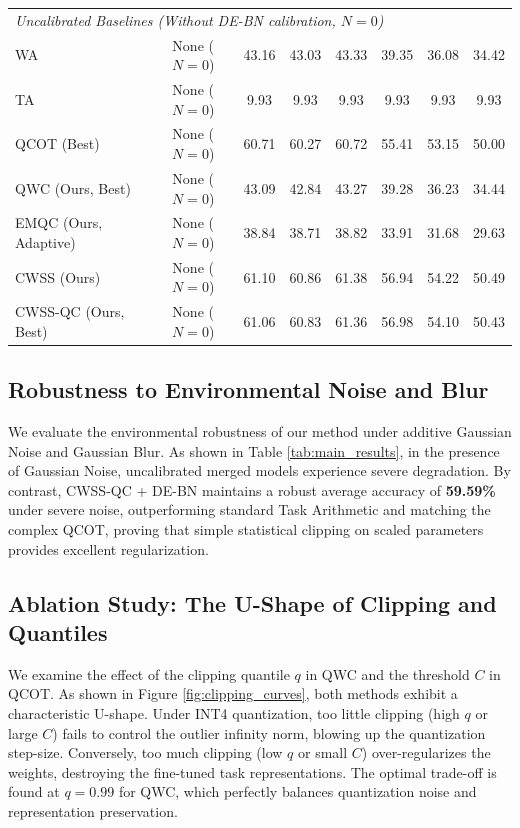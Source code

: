 \documentclass{article}
\theoremstyle{plain}
\theoremstyle{definition}
\theoremstyle{remark}
\begin{document}
\begin{table}[t]
\begin{tabular}{l c cccc cc}
\hline
\multicolumn{8}{l}{\textit{Uncalibrated Baselines (Without DE-BN calibration, $N=0$)}}\\
WA & None ($N=0$) & 43.16 & 43.03 & 43.33 & 39.35 & 36.08 & 34.42 \\
TA & None ($N=0$) & 9.93 & 9.93 & 9.93 & 9.93 & 9.93 & 9.93 \\
QCOT (Best) & None ($N=0$) & 60.71 & 60.27 & 60.72 & 55.41 & 53.15 & 50.00 \\
QWC (Ours, Best) & None ($N=0$) & 43.09 & 42.84 & 43.27 & 39.28 & 36.23 & 34.44 \\
EMQC (Ours, Adaptive) & None ($N=0$) & 38.84 & 38.71 & 38.82 & 33.91 & 31.68 & 29.63 \\
CWSS (Ours) & None ($N=0$) & 61.10 & 60.86 & 61.38 & 56.94 & 54.22 & 50.49 \\
CWSS-QC (Ours, Best) & None ($N=0$) & 61.06 & 60.83 & 61.36 & 56.98 & 54.10 & 50.43 \\
\hline
\end{tabular}
\end{table}


\subsection{Robustness to Environmental Noise and Blur}
We evaluate the environmental robustness of our method under additive Gaussian Noise and Gaussian Blur. As shown in Table \ref{tab:main_results}, in the presence of Gaussian Noise, uncalibrated merged models experience severe degradation. By contrast, CWSS-QC + DE-BN maintains a robust average accuracy of \textbf{59.59\%} under severe noise, outperforming standard Task Arithmetic and matching the complex QCOT, proving that simple statistical clipping on scaled parameters provides excellent regularization.

\subsection{Ablation Study: The U-Shape of Clipping and Quantiles}
We examine the effect of the clipping quantile $q$ in QWC and the threshold $C$ in QCOT. As shown in Figure \ref{fig:clipping_curves}, both methods exhibit a characteristic U-shape. Under INT4 quantization, too little clipping (high $q$ or large $C$) fails to control the outlier infinity norm, blowing up the quantization step-size. Conversely, too much clipping (low $q$ or small $C$) over-regularizes the weights, destroying the fine-tuned task representations. The optimal trade-off is found at $q = 0.99$ for QWC, which perfectly balances quantization noise and representation preservation.
\end{document}
